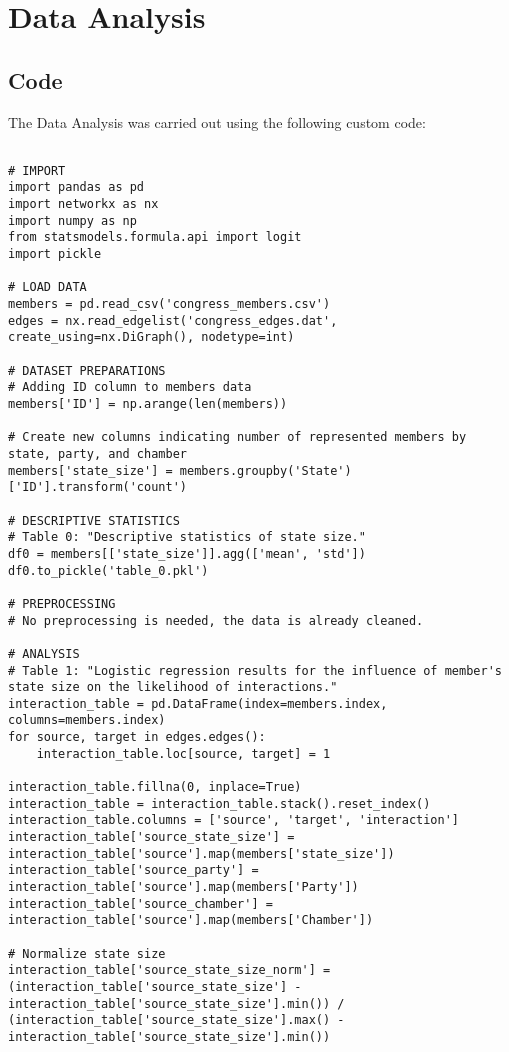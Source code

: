 \documentclass[11pt]{article}
\begin{document}
\section{Data Analysis}
\subsection{{Code}}
The Data Analysis was carried out using the following custom code:

\begin{verbatim}

# IMPORT
import pandas as pd
import networkx as nx
import numpy as np
from statsmodels.formula.api import logit
import pickle

# LOAD DATA
members = pd.read_csv('congress_members.csv')
edges = nx.read_edgelist('congress_edges.dat', create_using=nx.DiGraph(), nodetype=int)

# DATASET PREPARATIONS
# Adding ID column to members data
members['ID'] = np.arange(len(members))

# Create new columns indicating number of represented members by state, party, and chamber
members['state_size'] = members.groupby('State')['ID'].transform('count')

# DESCRIPTIVE STATISTICS
# Table 0: "Descriptive statistics of state size."
df0 = members[['state_size']].agg(['mean', 'std'])
df0.to_pickle('table_0.pkl')

# PREPROCESSING
# No preprocessing is needed, the data is already cleaned.

# ANALYSIS
# Table 1: "Logistic regression results for the influence of member's state size on the likelihood of interactions."
interaction_table = pd.DataFrame(index=members.index, columns=members.index)
for source, target in edges.edges():
    interaction_table.loc[source, target] = 1
    
interaction_table.fillna(0, inplace=True)
interaction_table = interaction_table.stack().reset_index()
interaction_table.columns = ['source', 'target', 'interaction']
interaction_table['source_state_size'] = interaction_table['source'].map(members['state_size'])
interaction_table['source_party'] = interaction_table['source'].map(members['Party'])
interaction_table['source_chamber'] = interaction_table['source'].map(members['Chamber'])

# Normalize state size
interaction_table['source_state_size_norm'] = (interaction_table['source_state_size'] - interaction_table['source_state_size'].min()) / (interaction_table['source_state_size'].max() - interaction_table['source_state_size'].min())


\end{verbatim}
\end{document}
